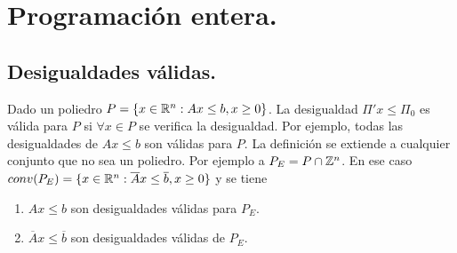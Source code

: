 \documentclass[MIOP.tex]{subfiles}
\begin{document}
\chapter{Programación entera.}

\section{Desigualdades válidas.}

Dado un poliedro $P=\{x\in\mathbb{R}^n:Ax\leq b,x\geq 0\}$. La desigualdad $\Pi'x\leq\Pi_0$ es válida para $P$ si $\forall x\in P$ se verifica la desigualdad. Por ejemplo, todas las desigualdades de $Ax\leq b$ son válidas para $P$. La definición se extiende a cualquier conjunto que no sea un poliedro. Por ejemplo a $P_E=P\cap\mathbb{Z}^n$. En ese caso $conv(P_E)=\{x\in\mathbb{R}^n:\overline{A}x\leq\overline{b},x\geq 0\}$ y se tiene
\begin{enumerate}
\item $Ax\leq b$ son desigualdades válidas para $P_E$.
\item $\overline{A}x\leq\overline{b}$ son desigualdades válidas de $P_E$. 
\end{enumerate} 
\end{document}
